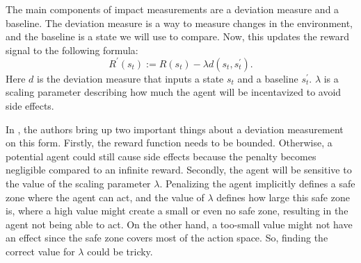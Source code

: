 \documentclass[12pt,A4]{report}
\newcommand{\autobaj}{}
\theoremstyle{definition}
\begin{document}
The main components of impact measurements are a deviation measure and a baseline. The deviation measure is a way to measure changes in the environment, and the baseline is a state we will use to compare. Now, this updates the reward signal to the following formula:
\[ R^\prime(s_{t}) := R(s_{t}) - \lambda d(s_{t}, s_{t}^\prime). \]
Here $d$ is the deviation measure that inputs a state $s_{t}$ and a baseline $s_{t}^\prime$. $\lambda$ is a scaling parameter describing how much the agent will be incentavized to avoid side effects.

In \citet{ArmstrongLevinstein}, the authors bring up two important things about a deviation measurement on this form. Firstly, the reward function needs to be bounded. Otherwise, a potential agent could still cause side effects because the penalty becomes negligible compared to an infinite reward. Secondly, the agent will be sensitive to the value of the scaling parameter $\lambda$. Penalizing the agent implicitly defines a safe zone where the agent can act, and the value of $\lambda$ defines how large this safe zone is, where a high value might create a small or even no safe zone, resulting in the agent not being able to act. On the other hand, a too-small value might not have an effect since the safe zone covers most of the action space. So, finding the correct value for $\lambda$ could be tricky. 




\end{document}
